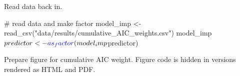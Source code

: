 \documentclass[]{article}
\newenvironment{Shaded}{}{}
\newcommand{\CommentTok}[1]{\textcolor[rgb]{0.00,0.50,0.00}{#1}}
\newcommand{\DataTypeTok}[1]{#1}
\newcommand{\KeywordTok}[1]{\textcolor[rgb]{0.00,0.00,1.00}{#1}}
\newcommand{\NormalTok}[1]{#1}
\newcommand{\OperatorTok}[1]{#1}
\newcommand{\StringTok}[1]{\textcolor[rgb]{0.00,0.50,0.50}{#1}}
\begin{document}
Read data back in.

\begin{Shaded}
\begin{Highlighting}[numbers=left,,]
\CommentTok{# read data and make factor}
\NormalTok{model_imp <-}\StringTok{ }\KeywordTok{read_csv}\NormalTok{(}\StringTok{"data/results/cumulative_AIC_weights.csv"}\NormalTok{)}
\NormalTok{model_imp}\OperatorTok{$}\NormalTok{predictor <-}\StringTok{ }\KeywordTok{as_factor}\NormalTok{(model_imp}\OperatorTok{$}\NormalTok{predictor)}
\end{Highlighting}
\end{Shaded}

\begin{Shaded}
\end{Shaded}

Prepare figure for cumulative AIC weight. Figure code is hidden in versions rendered as HTML and PDF.
\end{document}
